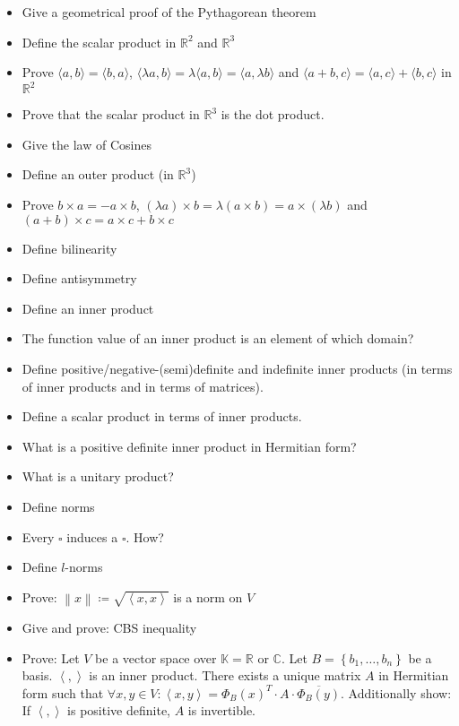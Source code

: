 \documentclass[a4paper]{article}
\newcommand{\set}[1]{\left\{#1\right\}}
\newcommand{\angel}[1]{\left\langle#1\right\rangle}
\newcommand{\norm}[1]{\left\|#1\right\|}
\begin{document}
\begin{itemize}
  \item Give a geometrical proof of the Pythagorean theorem
  \item Define the scalar product in $\mathbb R^2$ and $\mathbb R^3$
  \item Prove $\langle a, b\rangle = \langle b, a\rangle$, $\langle \lambda a, b\rangle = \lambda \langle a, b\rangle = \langle a, \lambda b\rangle$ and $\langle a + b, c \rangle = \langle a, c \rangle + \langle b, c \rangle$ in $\mathbb R^2$
  \item Prove that the scalar product in $\mathbb R^3$ is the dot product.
  \item Give the law of Cosines
  \item Define an outer product (in $\mathbb R^3$)
  \item Prove $b \times a = -a \times b$, $(\lambda a) \times b = \lambda (a \times b) = a \times (\lambda b)$ and $(a + b) \times c = a \times c + b \times c$
  \item Define bilinearity
  \item Define antisymmetry
  \item Define an inner product
  \item The function value of an inner product is an element of which domain?
  \item Define positive/negative-(semi)definite and indefinite inner products (in terms of inner products and in terms of matrices).
  \item Define a scalar product in terms of inner products.
  \item What is a positive definite inner product in Hermitian form?
  \item What is a unitary product?
  \item Define norms
  \item Every $\square{}$ induces a $\square{}$. How?
  \item Define $l$-norms
  \item Prove: $\norm{x} \coloneqq \sqrt{\angel{x, x}}$ is a norm on $V$
  \item Give and prove: CBS inequality
  \item Prove: Let $V$ be a vector space over $\mathbb K = \mathbb R$ or $\mathbb C$. Let $B = \set{b_1, \dots, b_n}$ be a basis. $\angel{,}$ is an inner product.
    There exists a unique matrix $A$ in Hermitian form such that $\forall x,y \in V: \angel{x,y} = \Phi_B(x)^T \cdot A \cdot \overline{\Phi_B(y)}$.
  	Additionally show: If $\angel{,}$ is positive definite, $A$ is invertible.

\end{itemize}
\end{document}
